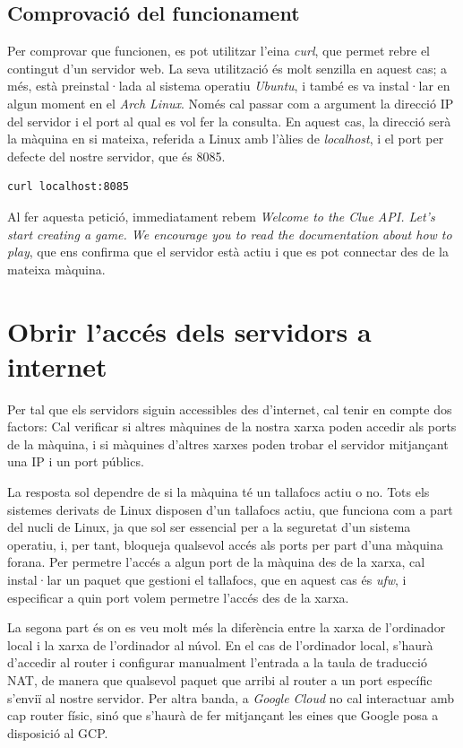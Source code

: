 \subsection{Comprovació del funcionament}

Per comprovar que funcionen, es pot utilitzar l'eina \textit{curl}, que permet rebre el contingut d'un servidor web. La seva utilització és molt senzilla en aquest cas; a més, està preinstal·lada al sistema operatiu \textit{Ubuntu}, i també es va instal·lar en algun moment en el \textit{Arch Linux}. Només cal passar com a argument la direcció IP del servidor i el port al qual es vol fer la consulta. En aquest cas, la direcció serà la màquina en si mateixa, referida a Linux amb l'àlies de \textit{localhost}, i el port per defecte del nostre servidor, que és 8085.

\begin{lstlisting}[language=bash, caption=Petició localhost al servidor]
    curl localhost:8085
\end{lstlisting}

Al fer aquesta petició, immediatament rebem \textit{Welcome to the Clue API. Let's start creating a game. We encourage you to read the documentation about how to play}, que ens confirma que el servidor està actiu i que es pot connectar des de la mateixa màquina.

\newpage \section{Obrir l'accés dels servidors a internet}

Per tal que els servidors siguin accessibles des d'internet, cal tenir en compte dos factors: Cal verificar si altres màquines de la nostra xarxa poden accedir als ports de la màquina, i si màquines d'altres xarxes poden trobar el servidor mitjançant una IP i un port públics.

La resposta sol dependre de si la màquina té un tallafocs actiu o no. Tots els sistemes derivats de Linux disposen d'un tallafocs actiu, que funciona com a part del nucli de Linux, ja que sol ser essencial per a la seguretat d'un sistema operatiu, i, per tant, bloqueja qualsevol accés als ports per part d'una màquina forana. Per permetre l'accés a algun port de la màquina des de la xarxa, cal instal·lar un paquet que gestioni el tallafocs, que en aquest cas és \textit{ufw}, i especificar a quin port volem permetre l'accés des de la xarxa.

La segona part és on es veu molt més la diferència entre la xarxa de l'ordinador local i la xarxa de l'ordinador al núvol. En el cas de l'ordinador local, s'haurà d'accedir al router i configurar manualment l'entrada a la taula de traducció NAT, de manera que qualsevol paquet que arribi al router a un port específic s'enviï al nostre servidor. Per altra banda, a \textit{Google Cloud} no cal interactuar amb cap router físic, sinó que s'haurà de fer mitjançant les eines que Google posa a disposició al GCP.


